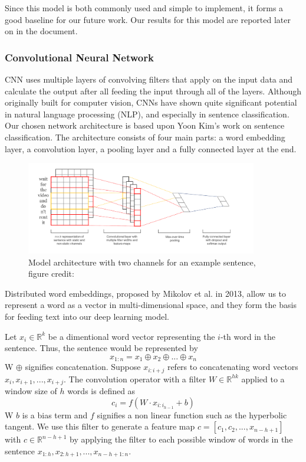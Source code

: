 \documentclass[conference]{IEEEtran}
\begin{document}
    Since this model is both commonly used and simple to implement, it forms a good baseline
    for our future work. Our results for this model are reported later on in the document.

\subsubsection{Convolutional Neural Network}
\label{model:back:cnn}
    CNN uses multiple layers of convolving filters that apply on the input data and
    calculate the output after all feeding the input through all of the layers. Although
    originally built for computer vision, CNNs have shown quite significant potential in
    natural language processing (NLP), and especially in sentence classification.
    Our chosen network architecture is based upon Yoon Kim's work on sentence
    classification\cite{kim2014convolutional}. The architecture consists of four 
    main parts: a word
    embedding layer, a convolution layer, a pooling layer and a fully connected layer
    at the end.
    \begin{figure}
    \center\includegraphics[width=0.9\textwidth]{figure/sc_model}
    \caption{Model architecture with two channels for an example sentence,
     figure credit: \cite{kim2014convolutional}}
    \end{figure}

    Distributed word embeddings, proposed by Mikolov et al.
    in 2013\cite{word2vec}, allow us to represent a word as a vector in
    multi-dimensional space, and they form the basis for feeding text into our deep
    learning model.

    Let $x_{i} \in \mathbb{R}^k$ be a dimentional word vector representing the $i$-th word in the
    sentence. Thus, the sentence would be represented by
    \begin{equation}
    x_{1:n} = x_1 \oplus x_2 \oplus ... \oplus x_n
    \end{equation}
    W $\oplus$ signifies concatenation. Suppose $x_{i:i+j}$ refers to concatenating
    word vectors $x_i, x_{i+1}, ... , x_{i+j}$. The convolution operator with a filter
    $W \in \mathbb{R}^{hk}$ applied to a window size of $h$
    words is defined as
    \begin{equation}
    c_i = f(W \cdot x_{i:i_{h-1}} + b)
    \end{equation}
    W $b$ is a bias term and $f$ signifies a non linear function such as the hyperbolic
    tangent. We use this filter to generate a feature map $c = [c_1, c_2, ... ,x_{n-h+1}]$
    with $c \in \mathbb{R}^{n-h+1}$ by applying the filter to each possible window of words in
    the sentence $x_{1:h}, x_{2:h+1}, ... ,x_{n-h+1:n}$.
\end{document}
